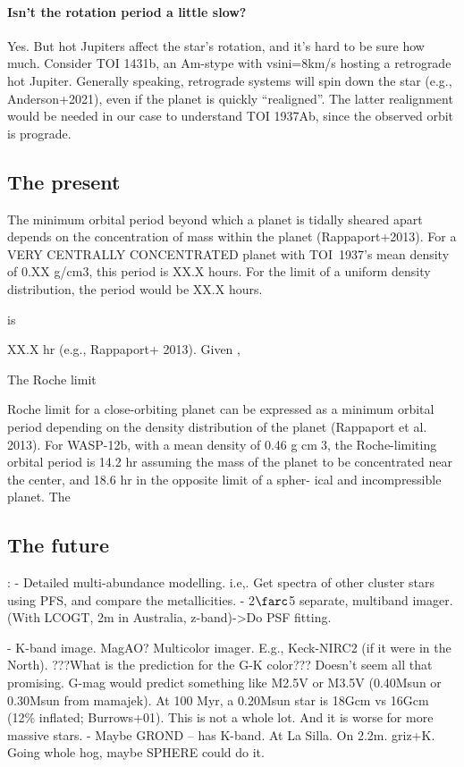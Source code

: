 \documentclass[12pt,twocolumn,tighten]{aastex63}
\newcommand{\tn}{TOI~1937} %
\begin{document}
\paragraph{Isn't the rotation period a little slow?}
Yes. But hot Jupiters affect the star's rotation, and it's hard to be
sure how much. Consider TOI 1431b, an Am-stype with vsini=8km/s
hosting a retrograde hot Jupiter. 
Generally speaking, retrograde systems will spin down the star (e.g.,
Anderson+2021), even if the planet is quickly ``realigned''.
The latter realignment would be needed in our case to understand TOI
1937Ab, since the observed orbit is prograde.

\subsection{The present}

The minimum orbital period beyond which a planet is tidally sheared
apart depends on the concentration of mass within the planet
(Rappaport+2013).
For a VERY CENTRALLY CONCENTRATED planet with \tn's
mean density of 0.XX g/cm3, this period is XX.X hours.
For the limit of a uniform density distribution, the period would be
XX.X hours.

is 

XX.X hr (e.g., Rappaport+ 2013).
Given ,


The Roche limit 

Roche limit for a close-orbiting planet can
be expressed as a minimum orbital period depending
on the density distribution of the planet (Rappaport
et al. 2013). For WASP-12b, with a mean density of
0.46 g cm􀀀3, the Roche-limiting orbital period is 14.2 hr
assuming the mass of the planet to be concentrated near
the center, and 18.6 hr in the opposite limit of a spher-
ical and incompressible planet. The

\subsection{The future}:
- Detailed multi-abundance modelling.
  i.e,. Get spectra of other cluster stars using PFS, and compare the metallicities.
- 2$\farc$5 separate, multiband imager. (With LCOGT, 2m in Australia,
  z-band)->Do PSF fitting.

- K-band image. MagAO? Multicolor imager.
  E.g., Keck-NIRC2 (if it were in the North).
  ???What is the prediction for the G-K color???
  Doesn't seem all that promising. G-mag would predict something like
  M2.5V or M3.5V (0.40Msun or 0.30Msun from mamajek).
  At 100 Myr, a 0.20Msun star is 18Gcm vs 16Gcm (12\% inflated;
  Burrows+01). This is not a whole lot. And it is worse for more massive
  stars.
- Maybe GROND -- has K-band. At La Silla. On 2.2m.  griz+K.
  Going whole hog, maybe SPHERE could do it.
\end{document}

